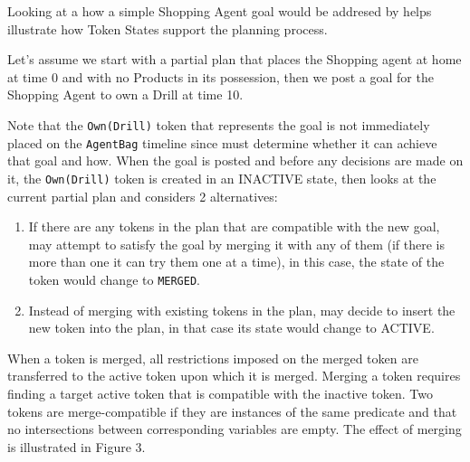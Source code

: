\begin{description}
  Looking at a how a simple Shopping Agent goal would be addresed by
  \eu helps illustrate how Token States support the planning process.

  Let's assume we start with a partial plan that places the Shopping
  agent at home at time 0 and with no Products in its possession, then
  we post a goal for the Shopping Agent to own a Drill at time 10.


  Note that the \texttt{Own(Drill)} token that represents the goal is
  not immediately placed on the \texttt{AgentBag} timeline since \eu
  must determine whether it can achieve that goal and how. When the
  goal is posted and before any decisions are made on it, the
  \texttt{Own(Drill)} token is created in an INACTIVE state, then \eu
  looks at the current partial plan and considers 2 alternatives:

\begin{enumerate}

\item If there are any tokens in the plan that are compatible with the
  new goal, \eu may attempt to satisfy the goal by merging it with any
  of them (if there is more than one it can try them one at a time),
  in this case, the state of the token would change to
  \texttt{MERGED}.

\item Instead of merging with existing tokens in the plan, \eu may
  decide to insert the new token into the plan, in that case its state
  would change to ACTIVE.

\end{enumerate}

When a token is merged, all restrictions imposed on the merged token
are transferred to the active token upon which it is merged. Merging a
token requires finding a target active token that is compatible with
the inactive token. Two tokens are merge-compatible if they are
instances of the same predicate and that no intersections between
corresponding variables are empty. The effect of merging is
illustrated in Figure 3.



\end{description}
